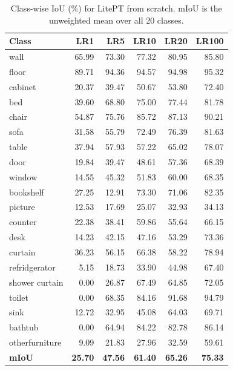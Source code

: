 \begin{table}[htbp]
\centering
\caption{Class-wise IoU (\%) for LitePT from scratch. mIoU is the unweighted mean over all 20 classes.}
\label{tab:classwise-litept-scratch}
\begin{tabular}{lrrrrr}
\hline
Class & LR1 & LR5 & LR10 & LR20 & LR100 \\
\hline
wall & 65.99 & 73.30 & 77.32 & 80.95 & 85.80 \\
floor & 89.71 & 94.36 & 94.57 & 94.98 & 95.32 \\
cabinet & 20.37 & 39.47 & 50.67 & 53.80 & 72.40 \\
bed & 39.60 & 68.80 & 75.00 & 77.44 & 81.78 \\
chair & 54.87 & 75.76 & 85.72 & 87.13 & 90.21 \\
sofa & 31.58 & 55.79 & 72.49 & 76.39 & 81.63 \\
table & 37.94 & 57.93 & 57.22 & 65.02 & 78.07 \\
door & 19.84 & 39.47 & 48.61 & 57.36 & 68.39 \\
window & 14.55 & 45.32 & 51.83 & 60.00 & 68.35 \\
bookshelf & 27.25 & 12.91 & 73.30 & 71.06 & 82.35 \\
picture & 12.53 & 17.69 & 25.07 & 32.93 & 34.13 \\
counter & 22.38 & 38.41 & 59.86 & 55.64 & 66.15 \\
desk & 14.23 & 42.15 & 47.16 & 53.29 & 73.36 \\
curtain & 36.23 & 56.15 & 66.38 & 58.22 & 78.94 \\
refridgerator & 5.15 & 18.73 & 33.90 & 44.98 & 67.40 \\
shower curtain & 0.00 & 26.87 & 67.49 & 64.85 & 72.05 \\
toilet & 0.00 & 68.35 & 84.16 & 91.68 & 94.79 \\
sink & 12.72 & 32.95 & 45.08 & 64.03 & 69.71 \\
bathtub & 0.00 & 64.94 & 84.22 & 82.78 & 86.14 \\
otherfurniture & 9.09 & 21.83 & 27.96 & 32.59 & 59.61 \\
\hline
\textbf{mIoU} & \textbf{25.70} & \textbf{47.56} & \textbf{61.40} & \textbf{65.26} & \textbf{75.33} \\
\hline
\end{tabular}
\end{table}

